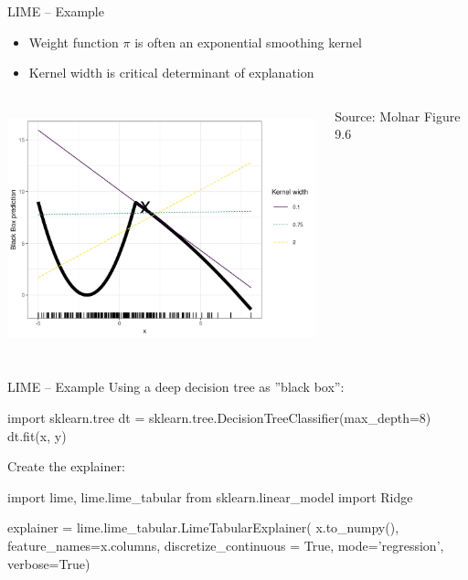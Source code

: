 \documentclass[ignorenonframetext,xcolor=x11names]{beamer}
\begin{document}
\begin{frame}{LIME -- Example}
\begin{itemize}
   \item Weight function $\pi$ is often an exponential smoothing kernel
   \item Kernel width is critical determinant of explanation
\end{itemize}
\begin{columns}
\begin{column}{.9\textwidth}
\includegraphics[height=2.75in]{molnar-9-6.jpeg}
\end{column}
\begin{column}{.15\textwidth}
\scriptsize Source: Molnar Figure 9.6
\end{column}
\end{columns}
\end{frame}

\begin{frame}[fragile]{LIME -- Example}
Using a deep decision tree as ''black box'':
\begin{pythoncode}
import sklearn.tree
dt = sklearn.tree.DecisionTreeClassifier(max_depth=8)
dt.fit(x, y)
\end{pythoncode}
Create the explainer:
\begin{pythoncode}
import lime, lime.lime_tabular
from sklearn.linear_model import Ridge

explainer = lime.lime_tabular.LimeTabularExplainer(
    x.to_numpy(), 
    feature_names=x.columns, 
    discretize_continuous = True, 
    mode='regression', 
    verbose=True)
\end{pythoncode}
\end{frame}
\end{document}
